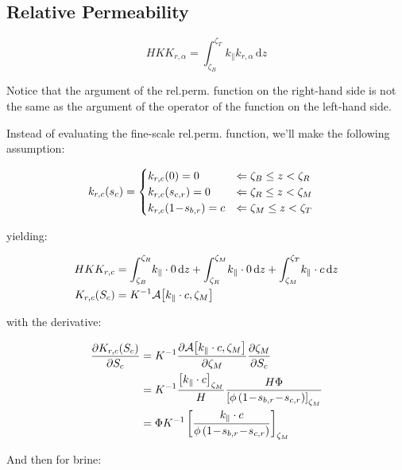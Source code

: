 \documentclass[12pt]{scrartcl}
\newcommand{\aleft}{\mathopen{}\mathclose\bgroup\left}  %
\newcommand{\aright}{\aftergroup\egroup\right}          %
\newcommand{\binop}[3]{#1\mkern1mu{#2}\mkern1mu #3}     %
\newcommand{\dual}[1]{\binop{1}{-}{#1}}                 %
\newcommand{\ddual}[2]{\binop{\binop{1}{-}{#1}}{-}{#2}} %
\newcommand{\at}[2]{\left[ #1 \right]_{#2}}             %
\newcommand{\der}[2]{\frac{\partial{#1}}{\partial{#2}}}       %
\newcommand{\intg}[4]{\int_{#1}^{#2}\!{#3}\,\mathrm{d}{#4}}   %
\newcommand{\inv}[1]{{#1}^{-1}}                               %
\newcommand{\latr}[1]{{#1}_{\|}}                              %
\newcommand{\Hei}{H}        %
\newcommand{\Por}{\Phi}     %
\newcommand{\por}{\phi}     %
\newcommand{\Sat}{S}        %
\newcommand{\sat}{s}        %
\newcommand{\sr}[1]{\sat_{#1,r}}    %
\newcommand{\Prm}{K}        %
\newcommand{\prm}{k}        %
\newcommand{\Rlp}[1]{K_{r,#1}}  %
\newcommand{\rlp}[1]{k_{r,#1}}  %
\newcommand{\phs}{\alpha}   %
\newcommand{\Lev}{\zeta}    %
\newcommand{\Top}{T}        %
\newcommand{\Bot}{B}        %
\newcommand{\Res}{R}        %
\newcommand{\Mob}{M}        %
\newcommand{\dph}{z}        %
\newcommand{\nap}{c}        %
\newcommand{\wet}{b}        %
\newcommand{\avg}[2]{\mathcal{A}\aleft[#1, #2\aright]}  %
\newcommand{\krnwr}{c}      %
\newcommand{\Satn}{\Sat_\nap}
\newcommand{\satn}{\sat_\nap}
\newcommand{\snr}{\sr{\nap}}    %
\newcommand{\swr}{\sr{\wet}}    %
\newcommand{\LevT}{\Lev_\Top}
\newcommand{\LevB}{\Lev_\Bot}
\newcommand{\LevM}{\Lev_\Mob}
\newcommand{\LevR}{\Lev_\Res}
\newcommand{\Rlpp}{\Rlp{\phs}}  %
\newcommand{\rlpp}{\rlp{\phs}}
\newcommand{\Rlpn}{\Rlp{\nap}}  %
\newcommand{\rlpn}{\rlp{\nap}}
\newcommand{\Absprm}{\Prm}          %
\newcommand{\absprm}{\latr{\prm}}   %
\begin{document}
\subsection{Relative Permeability}
\begin{equation}
\Hei \Prm \Rlpp = \intg{ \LevB }{ \LevT }{ \latr{ \prm } \rlpp }{ \dph }
\end{equation}

Notice that the argument of the rel.perm. function on the right-hand side is not the same as the argument of the operator of the function on the left-hand side.

Instead of evaluating the fine-scale rel.perm. function, we'll make the following assumption:

\begin{align}
\rlpn \aleft( \satn \aright) &=
\begin{cases}
\rlpn \aleft( 0 \aright) = 0 & \Leftarrow \LevB \leq \dph < \LevR \\
\rlpn \aleft( \snr \aright) = 0 & \Leftarrow \LevR \leq \dph < \LevM \\
\rlpn \aleft( \dual{\swr} \aright) = \krnwr & \Leftarrow \LevM \leq \dph < \LevT
\end{cases}
\end{align}

yielding:

\begin{align}
\Hei \Absprm \Rlpn &= \intg{ \LevB }{ \LevR }{ \absprm \cdot 0 }{ \dph } + \intg{ \LevR }{ \LevM }{ \absprm \cdot 0 }{ \dph } + \intg{ \LevM }{ \LevT }{ \absprm \cdot \krnwr }{ \dph } \\
\Rlpn \aleft( \Satn \aright) &= \inv{ \Absprm } \avg{ \absprm \cdot \krnwr }{ \LevM }
\end{align}

with the derivative:

\begin{align}
\der{ \Rlpn \aleft( \Satn \aright) }{ \Satn } &= \inv{ \Absprm } \der{ \avg{ \absprm \cdot \krnwr }{ \LevM } }{ \LevM } \der{ \LevM }{ \Satn } \\
&= \inv{ \Absprm } \frac{ \at{ \absprm \cdot \krnwr }{ \LevM }}{ \Hei } \frac{ \Hei \Por }{ \at{ \por \left( \ddual{ \swr }{ \snr } \right) }{ \LevM }} \\
&= \Por \inv{ \Absprm } \at{ \frac{ \absprm \cdot \krnwr }{ \por \left( \ddual{ \swr }{ \snr } \right) } }{ \LevM }
\end{align}

And then for brine:
\end{document}
